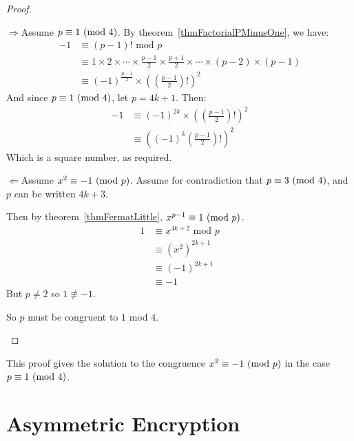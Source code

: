 \documentclass[../Main.tex]{subfiles}
\begin{document}
\begin{proof}
    \begin{proofdirection}{$\Rightarrow$}{Assume $p \equiv 1~(\text{mod}~{4})$.}
        By theorem~\ref{thmFactorialPMinusOne}, we have:
        \begin{align*}
            -1 &\equiv (p-1)! \text{ mod } p \\
            &\equiv 1 \times 2 \times \cdots \times \frac{p-1}{2} \times \frac{p+1}{2} \times \cdots \times (p-2) \times (p-1) \\
            &\equiv (-1)^{\frac{p-1}{2}} \times \left(\left(\frac{p-1}{2}\right)!\right)^2
        \end{align*}
        And since $p \equiv 1~(\text{mod}~{4})$, let $p = 4k + 1$. Then:
        \begin{align*}
            -1 &\equiv (-1)^{2k} \times \left(\left(\frac{p-1}{2}\right)!\right)^2 \\
            &\equiv \left((-1)^k \left(\frac{p-1}{2}\right)!\right)^2
        \end{align*}
        Which is a square number, as required.
    \end{proofdirection}
    \begin{proofdirection}{$\Leftarrow$}{Assume $x^2 \equiv -1~(\text{mod}~{p})$.}
        Assume for contradiction that $p \equiv 3~(\text{mod}~{4})$, and $p$ can be written $4k + 3$.\par
        Then by theorem~\ref{thmFermatLittle}, $x^{p-1} \equiv 1~(\text{mod}~{p})$.
        \begin{align*}
            1 &\equiv x^{4k+2} \text{ mod } p \\
            &\equiv \left(x^2\right)^{2k+1} \\
            &\equiv (-1)^{2k+1} \\
            &\equiv -1
        \end{align*}
        But $p \neq 2$ so $1 \not\equiv -1$. \contradiction\par
        So $p$ must be congruent to $1$ mod $4$.
    \end{proofdirection}
\end{proof}
\begin{remark}
    This proof gives the solution to the congruence $x^2 \equiv -1~(\text{mod}~{p})$ in the case $p \equiv 1~(\text{mod}~{4})$.
\end{remark}
\section{Asymmetric Encryption}
\end{document}

